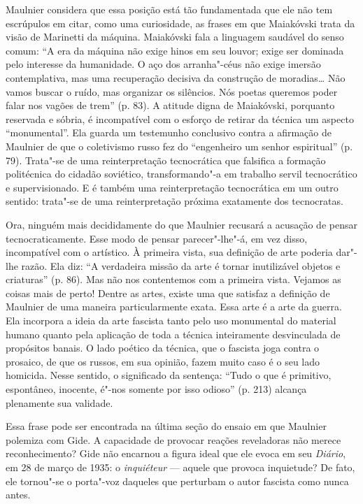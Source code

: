 Maulnier considera que essa posição está tão fundamentada que ele não
tem escrúpulos em citar, como uma curiosidade, as frases em que
Maiakóvski trata da visão de Marinetti da máquina. Maiakóvski fala
a linguagem saudável do senso comum: ``A era da máquina não exige hinos
em seu louvor; exige ser dominada pelo interesse da humanidade. O aço
dos arranha"-céus não exige imersão contemplativa, mas uma recuperação
decisiva da construção de moradias\ldots{} Não vamos buscar o ruído, mas
organizar os silêncios. Nós poetas queremos poder falar nos vagões de
trem'' (p. 83). A atitude digna de Maiakóvski, porquanto reservada e
sóbria, é incompatível com o esforço de retirar da técnica um aspecto
``monumental''. Ela guarda um testemunho conclusivo contra a afirmação
de Maulnier de que o coletivismo russo fez do ``engenheiro um senhor
espiritual'' (p. 79). Trata"-se de uma reinterpretação tecnocrática que
falsifica a formação politécnica do cidadão soviético,
transformando"-a em trabalho servil tecnocrático e supervisionado.
E é também uma reinterpretação tecnocrática em um outro sentido: trata"-se de
uma reinterpretação próxima exatamente dos tecnocratas.

Ora, ninguém mais decididamente do que Maulnier recusará a acusação de
pensar tecnocraticamente. Esse modo de pensar parecer"-lhe"-á, em vez
disso, incompatível com o artístico. À primeira vista, sua definição de
arte poderia dar"-lhe razão. Ela diz: ``A verdadeira missão da arte é
tornar inutilizável objetos e criaturas'' (p. 86). Mas não nos
contentemos com a primeira vista. Vejamos as coisas mais de perto!
Dentre as artes, existe uma que satisfaz a definição de Maulnier de uma
maneira particularmente exata. Essa arte é a arte da guerra. Ela
incorpora a ideia da arte fascista tanto pelo uso monumental do material
humano quanto pela aplicação de toda a técnica inteiramente desvinculada
de propósitos banais. O lado poético da técnica, que o fascista joga
contra o prosaico, de que os russos, em sua opinião, fazem muito caso é
o seu lado homicida. Nesse sentido, o significado da sentença: ``Tudo o
que é primitivo, espontâneo, inocente, é"-nos somente por isso odioso''
(p. 213) alcança plenamente sua validade.

Essa frase pode ser encontrada na última seção do ensaio em que Maulnier
polemiza com Gide. A capacidade de provocar reações reveladoras não
merece reconhecimento? Gide não encarnou a figura ideal que ele evoca em
seu \emph{Diário}, em 28 de março de 1935: o \emph{inquiéteur} --- aquele
que provoca inquietude? De fato, ele tornou"-se o porta"-voz daqueles que
perturbam o autor fascista como nunca antes.

